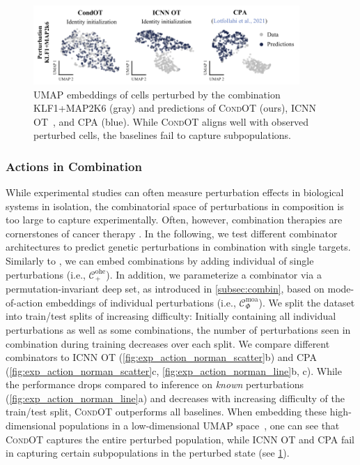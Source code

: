  \begin{figure}
    \centering
    \includegraphics[width=0.9\textwidth]{figures/fig_action_comb_comparison_umap.pdf}
    \caption{ \acrshort{UMAP} embeddings of cells perturbed by the combination KLF1+MAP2K6 (gray) and predictions of \textsc{CondOT} (ours), \textsc{ICNN OT}~\citep{makkuva2020optimal}, and \textsc{CPA} (blue). While \textsc{CondOT} aligns well with observed perturbed cells, the baselines fail to capture subpopulations.}
    \label{fig:action_comb_comparison_umap}
\end{figure}
 

\subsubsection{Actions in Combination}
\label{sec:eval_action_comb}

 While experimental studies can often measure perturbation effects in biological systems in isolation, the combinatorial space of perturbations in composition is too large to capture experimentally. Often, however, combination therapies are cornerstones of cancer therapy \citep{mokhtari2017combination}.
In the following, we test different combinator architectures to predict genetic perturbations in combination with single targets.
Similarly to \citet{lotfollahi2021compositional}, we can embed combinations by adding individual  of single perturbations (i.e., $\mathcal{C}^\text{ohe}_+$). In addition, we parameterize a combinator via a permutation-invariant deep set, as introduced in \cref{subsec:combin}, based on mode-of-action embeddings of individual perturbations (i.e., $\mathcal{C}^\text{moa}_\Phi$). 
We split the dataset into train/test splits of increasing difficulty: Initially containing all individual perturbations as well as some combinations, the number of perturbations seen in combination during training decreases over each split.
We compare different combinators to \textsc{ICNN OT} (\cref{fig:exp_action_norman_scatter}b) and \textsc{CPA}~\citep{lotfollahi2021compositional} (\cref{fig:exp_action_norman_scatter}c, \cref{fig:exp_action_norman_line}b, c). While the performance drops compared to inference on \emph{known} perturbations (\cref{fig:exp_action_norman_line}a) and decreases with increasing difficulty of the train/test split, \textsc{CondOT} outperforms all baselines.
When embedding these high-dimensional populations in a low-dimensional \acrshort{UMAP} space~\citep{umap}, one can see that \textsc{CondOT} captures the entire perturbed population, while \textsc{ICNN OT} and \textsc{CPA} fail in capturing certain subpopulations in the perturbed state (see \cref{fig:action_comb_comparison_umap}).


